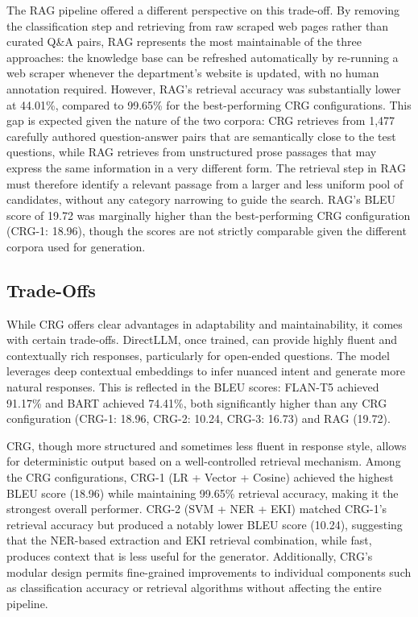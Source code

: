 \documentclass[conference]{IEEEtran}
\begin{document}
The RAG pipeline offered a different perspective on this trade-off.
By removing the classification step and retrieving from raw scraped web pages rather than curated Q\&A pairs, RAG represents the most maintainable of the three approaches: the knowledge base can be refreshed automatically by re-running a web scraper whenever the department's website is updated, with no human annotation required.
However, RAG's retrieval accuracy was substantially lower at 44.01\%, compared to 99.65\% for the best-performing CRG configurations.
This gap is expected given the nature of the two corpora: CRG retrieves from 1,477 carefully authored question-answer pairs that are semantically close to the test questions, while RAG retrieves from unstructured prose passages that may express the same information in a very different form.
The retrieval step in RAG must therefore identify a relevant passage from a larger and less uniform pool of candidates, without any category narrowing to guide the search.
RAG's BLEU score of 19.72 was marginally higher than the best-performing CRG configuration (CRG-1: 18.96), though the scores are not strictly comparable given the different corpora used for generation.

\subsection{Trade-Offs}
While CRG offers clear advantages in adaptability and maintainability, it comes with certain trade-offs. 
DirectLLM, once trained, can provide highly fluent and contextually rich responses, particularly for open-ended questions. 
The model leverages deep contextual embeddings to infer nuanced intent and generate more natural responses.
This is reflected in the BLEU scores: FLAN-T5 achieved 91.17\% and BART achieved 74.41\%, both significantly higher than any CRG configuration (CRG-1: 18.96, CRG-2: 10.24, CRG-3: 16.73) and RAG (19.72).

CRG, though more structured and sometimes less fluent in response style, allows for deterministic output based on a well-controlled retrieval mechanism.
Among the CRG configurations, CRG-1 (LR + Vector + Cosine) achieved the highest BLEU score (18.96) while maintaining 99.65\% retrieval accuracy, making it the strongest overall performer.
CRG-2 (SVM + NER + EKI) matched CRG-1's retrieval accuracy but produced a notably lower BLEU score (10.24), suggesting that the NER-based extraction and EKI retrieval combination, while fast, produces context that is less useful for the generator.
Additionally, CRG's modular design permits fine-grained improvements to individual components such as classification accuracy or retrieval algorithms without affecting the entire pipeline.
\end{document}
